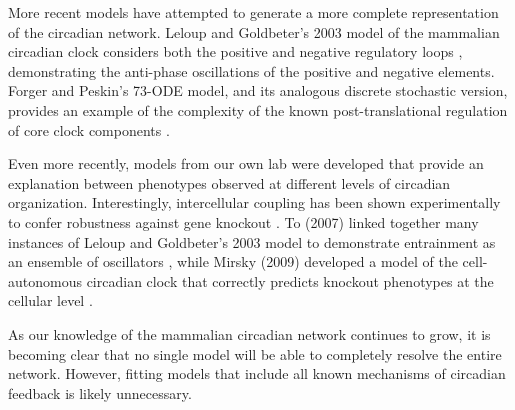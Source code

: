 More recent models have attempted to generate a more complete representation of the circadian network. 
Leloup and Goldbeter's 2003 model of the mammalian circadian clock considers both the positive and negative regulatory loops \cite{Leloup2003}, demonstrating the anti-phase oscillations of the positive and negative elements. 
Forger and Peskin's 73-ODE model, and its analogous discrete stochastic version, provides an example of the complexity of the known post-translational regulation of core clock components \cite{Forger2003,Forger2005}.

Even more recently, models from our own lab were developed that provide an explanation between phenotypes observed at different levels of circadian organization. 
Interestingly, intercellular coupling has been shown experimentally to confer robustness against gene knockout \cite{Liu2007}. 
To (2007) linked together many instances of Leloup and Goldbeter's 2003 model to demonstrate entrainment as an ensemble of oscillators \cite{To2007}, while Mirsky (2009) developed a model of the cell-autonomous circadian clock that correctly predicts knockout phenotypes at the cellular level \cite{Mirsky2009}.

As our knowledge of the mammalian circadian network continues to grow, it is becoming clear that no single model will be able to completely resolve the entire network. 
However, fitting models that include all known mechanisms of circadian feedback is likely unnecessary. 

